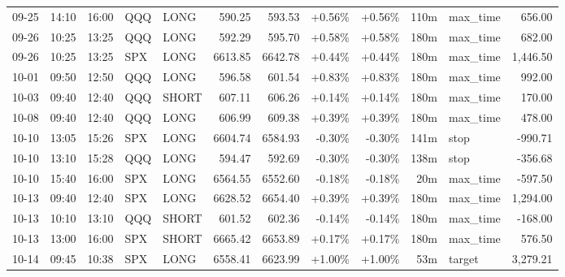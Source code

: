 \documentclass[11pt,a4paper]{article}
\begin{document}
\begin{center}
\begin{longtable}{>{\color{txtmain}}l l l l l r r r r r >{\color{txtmain}}l r}
09-25 & 14:10 & 16:00 & QQQ & LONG & 590.25 & 593.53 & \textcolor{wingreen}{+0.56\%} & \textcolor{wingreen}{+0.56\%} & 110m & max\_time & \textcolor{wingreen}{656.00} \\
09-26 & 10:25 & 13:25 & QQQ & LONG & 592.29 & 595.70 & \textcolor{wingreen}{+0.58\%} & \textcolor{wingreen}{+0.58\%} & 180m & max\_time & \textcolor{wingreen}{682.00} \\
09-26 & 10:25 & 13:25 & SPX & LONG & 6613.85 & 6642.78 & \textcolor{wingreen}{+0.44\%} & \textcolor{wingreen}{+0.44\%} & 180m & max\_time & \textcolor{wingreen}{1,446.50} \\
10-01 & 09:50 & 12:50 & QQQ & LONG & 596.58 & 601.54 & \textcolor{wingreen}{+0.83\%} & \textcolor{wingreen}{+0.83\%} & 180m & max\_time & \textcolor{wingreen}{992.00} \\
10-03 & 09:40 & 12:40 & QQQ & SHORT & 607.11 & 606.26 & \textcolor{wingreen}{+0.14\%} & \textcolor{wingreen}{+0.14\%} & 180m & max\_time & \textcolor{wingreen}{170.00} \\
10-08 & 09:40 & 12:40 & QQQ & LONG & 606.99 & 609.38 & \textcolor{wingreen}{+0.39\%} & \textcolor{wingreen}{+0.39\%} & 180m & max\_time & \textcolor{wingreen}{478.00} \\
10-10 & 13:05 & 15:26 & SPX & LONG & 6604.74 & 6584.93 & \textcolor{lossred}{-0.30\%} & \textcolor{lossred}{-0.30\%} & 141m & stop & \textcolor{lossred}{-990.71} \\
10-10 & 13:10 & 15:28 & QQQ & LONG & 594.47 & 592.69 & \textcolor{lossred}{-0.30\%} & \textcolor{lossred}{-0.30\%} & 138m & stop & \textcolor{lossred}{-356.68} \\
10-10 & 15:40 & 16:00 & SPX & LONG & 6564.55 & 6552.60 & \textcolor{lossred}{-0.18\%} & \textcolor{lossred}{-0.18\%} & 20m & max\_time & \textcolor{lossred}{-597.50} \\
10-13 & 09:40 & 12:40 & SPX & LONG & 6628.52 & 6654.40 & \textcolor{wingreen}{+0.39\%} & \textcolor{wingreen}{+0.39\%} & 180m & max\_time & \textcolor{wingreen}{1,294.00} \\
10-13 & 10:10 & 13:10 & QQQ & SHORT & 601.52 & 602.36 & \textcolor{lossred}{-0.14\%} & \textcolor{lossred}{-0.14\%} & 180m & max\_time & \textcolor{lossred}{-168.00} \\
10-13 & 13:00 & 16:00 & SPX & SHORT & 6665.42 & 6653.89 & \textcolor{wingreen}{+0.17\%} & \textcolor{wingreen}{+0.17\%} & 180m & max\_time & \textcolor{wingreen}{576.50} \\
10-14 & 09:45 & 10:38 & SPX & LONG & 6558.41 & 6623.99 & \textcolor{wingreen}{+1.00\%} & \textcolor{wingreen}{+1.00\%} & 53m & target & \textcolor{wingreen}{3,279.21} \\

\end{longtable}
\end{center}
\end{document}
